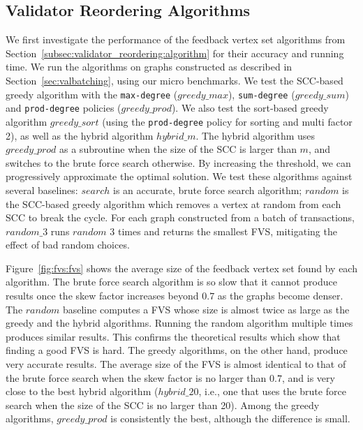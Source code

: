 \subsection{Validator Reordering Algorithms}
We first investigate the performance of the feedback vertex set algorithms from Section~\ref{subsec:validator_reordering:algorithm} 
for their accuracy and running time. We run the algorithms on graphs constructed as described in Section~\ref{sec:valbatching}, using our micro benchmarks. 
We test the SCC-based greedy algorithm with the \texttt{max-degree} ($greedy\_max$), \texttt{sum-degree} ($greedy\_sum$) and \texttt{prod-degree} policies ($greedy\_prod$). We also test the sort-based greedy algorithm $greedy\_sort$ (using the \texttt{prod-degree} policy for sorting and multi factor 2), as well as the hybrid algorithm $hybrid\_m$. The hybrid algorithm uses $greedy\_prod$ as a subroutine when the size of the SCC is larger than $m$, and switches to the brute force search otherwise. By increasing the threshold, we can progressively approximate the optimal solution. 
We test these algorithms against several baselines: $search$ is an accurate,
brute force search algorithm; $random$ is the SCC-based greedy algorithm which
removes a vertex at random from each SCC to break the cycle. For each graph constructed from a batch of transactions,
$random\_3$ runs $random$ 3 times and returns the smallest FVS, mitigating the
effect of bad random choices.

Figure~\ref{fig:fvs:fvs} shows the average size of the feedback vertex set found by each algorithm. The brute force search algorithm is so slow that it cannot produce results once the skew factor increases beyond $0.7$ as the graphs become denser.
The $random$ baseline computes a FVS whose size is almost twice as large as the greedy and the hybrid algorithms. Running the random algorithm multiple times produces similar results. This confirms the theoretical results which show that finding a good FVS is hard. The greedy algorithms, on the other hand, produce very accurate results. The average size of the FVS is almost identical to that of the brute force search when the skew factor is no larger than $0.7$, and is very close to the best hybrid algorithm ($hybrid\_20$, i.e., one that uses the brute force search when the size of the SCC is no larger than 20). Among the greedy algorithms, $greedy\_prod$ is consistently the best, although the difference is small.

